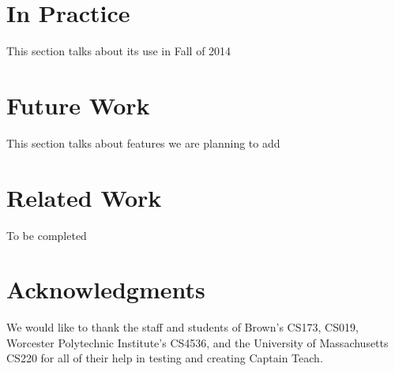 \documentclass{sig-alternate}
\begin{document}
\section{In Practice}
This section talks about its use in Fall of 2014

\section{Future Work}
This section talks about features we are planning to add


\section{Related Work}
To be completed


\section{Acknowledgments}
We would like to thank the staff and students of Brown's CS173, CS019, 
Worcester Polytechnic Institute's CS4536, and the University of Massachusetts
CS220 for all of their help in testing and creating Captain Teach.



%

%
%
\end{document}
